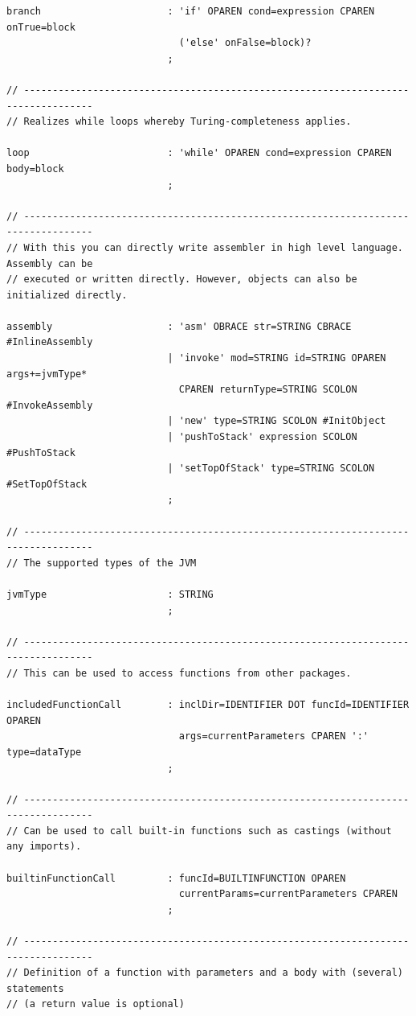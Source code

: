 \begin{lstlisting}[frame=htrbl, caption={Parser rules of grammar {\ttfamily E}}, label={lst:pe}, basicstyle=\scriptsize]
branch                      : 'if' OPAREN cond=expression CPAREN onTrue=block 
                              ('else' onFalse=block)?
                            ;

// ----------------------------------------------------------------------------------
// Realizes while loops whereby Turing-completeness applies.

loop                        : 'while' OPAREN cond=expression CPAREN body=block
                            ;

// ----------------------------------------------------------------------------------
// With this you can directly write assembler in high level language. Assembly can be
// executed or written directly. However, objects can also be initialized directly.

assembly                    : 'asm' OBRACE str=STRING CBRACE #InlineAssembly
                            | 'invoke' mod=STRING id=STRING OPAREN args+=jvmType* 
                              CPAREN returnType=STRING SCOLON #InvokeAssembly
                            | 'new' type=STRING SCOLON #InitObject
                            | 'pushToStack' expression SCOLON #PushToStack
                            | 'setTopOfStack' type=STRING SCOLON #SetTopOfStack
                            ;

// ----------------------------------------------------------------------------------
// The supported types of the JVM

jvmType                     : STRING
                            ;

// ----------------------------------------------------------------------------------
// This can be used to access functions from other packages.

includedFunctionCall        : inclDir=IDENTIFIER DOT funcId=IDENTIFIER OPAREN
                              args=currentParameters CPAREN ':' type=dataType
                            ;

// ----------------------------------------------------------------------------------
// Can be used to call built-in functions such as castings (without any imports).

builtinFunctionCall         : funcId=BUILTINFUNCTION OPAREN
                              currentParams=currentParameters CPAREN
                            ;

// ----------------------------------------------------------------------------------
// Definition of a function with parameters and a body with (several) statements 
// (a return value is optional)


\end{lstlisting}
